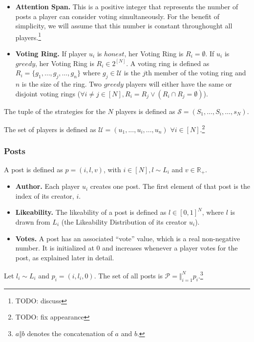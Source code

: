 \begin{itemize}
\begin{itemize}
          \item \textbf{Attention Span.} This is a positive integer that
          represents the number of posts a player can consider voting
          simultaneously. For the benefit of simplicity, we will assume that this
          number is constant throughought all players.\footnote{TODO: discuss}

          \item \textbf{Voting Ring.}  If player $u_i$ is $honest$, her Voting
          Ring is $R_i = \emptyset$. If $u_i$ is $greedy$, her Voting Ring is $R_i
          \in 2^{\left[N\right]}$. A voting ring is defined as $R_i = \lbrace
          g_1, \dots, g_j, \dots, g_n \rbrace$ where $g_j \in \mathcal{U}$ is the
          $j$th member of the voting ring and $n$ is the size of the ring. Two
          $greedy$ players will either have the same or disjoint voting rings
          ($\forall i \neq j \in \left[N\right], R_i = R_j \vee \left(R_i \cap
          R_j = \emptyset\right)$).
        \end{itemize}
        The tuple of the strategies for the $N$ players is defined as
        $\mathcal{S} = (S_1, \dots, S_i, \dots, s_N)$.
      \end{itemize}
      The set of players is defined as $\mathcal{U} = ( u_1,..., u_i,..., u_n )$
      $\forall i \in \left[N\right]$.\footnote{TODO: fix appearance}

    \subsubsection*{Posts}
      A post is defined as $p = \left(i, l, v\right)$, with $i \in
      \left[N\right], l \sim L_i$ and $v \in \mathbb{R}_{+}$.
      \begin{itemize}
        \item \textbf{Author.} Each player $u_i$ creates one post. The first
        element of that post is the index of its creator, $i$.

        \item \textbf{Likeability.} The likeability of a post is defined as $l
        \in \left[0, 1\right]^N$, where $l$ is drawn from $L_i$ (the Likeability
        Distribution of its creator $u_i$).

        \item \textbf{Votes.} A post has an associated ``vote'' value, which is a
        real non-negative number. It is initialized at 0 and increases whenever a
        player votes for the post, as explained later in detail.
      \end{itemize}
      Let $l_i \sim L_i$ and $p_i = \left(i, l_i, 0\right)$. The set of all posts
      is $\mathcal{P} = \Vert_{i=1}^N p_i$.\footnote{$a \Vert b$ denotes the
      concatenation of $a$ and $b$.}



